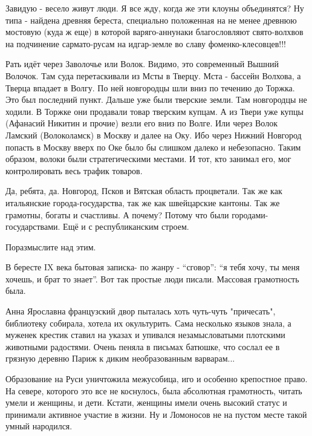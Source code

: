 \begin{itemize}
Завидую - весело живут люди. Я все жду, когда же эти клоуны объединятся? Ну
типа - найдена древняя береста, специально положенная на не менее древнюю
мостовую (куда ж еще) в которой варяго-аннунаки благословляют свято-волхвов на
подчинение сармато-русам на идгар-земле во славу фоменко-клесовцев!!!


Рать идёт через Заволочье или Волок. Видимо, это современный Вышний Волочок.
Там суда перетаскивали из Мсты в Тверцу. Мста - бассейн Волхова, а Тверца
впадает в Волгу. По ней новгородцы шли вниз по течению до Торжка. Это был
последний пункт. Дальше уже были тверские земли. Там новгородцы не ходили. В
Торжке они продавали товар тверским купцам. А из Твери уже купцы (Афанасий
Никитин и прочие) везли его вниз по Волге. Или через Волок Ламский
(Волоколамск) в Москву и далее на Оку. Ибо через Нижний Новгород попасть в
Москву вверх по Оке было бы слишком далеко и небезопасно. Таким образом, волоки
были стратегическими местами. И тот, кто занимал его, мог контролировать весь
трафик товаров.


Да, ребята, да. Новгород, Псков и Вятская область процветали. Так же как
итальянские города-государства, так же как швейцарские кантоны. Так же
грамотны, богаты и счастливы. А почему? Потому что были городами-государствами.
Ещё и с республиканским строем.

Поразмыслите над этим.


В бересте IX века бытовая записка- по жанру - \enquote{сговор}: \enquote{я тебя хочу, ты меня
хочешь, и брат то знает}. Вот так простые люди писали. Массовая грамотность
была.


Анна Ярославна французский двор пыталась хоть чуть-чуть "причесать", библиотеку
собирала, хотела их окультурить. Сама несколько языков знала, а муженек крестик
ставил на указах и упивался незамысловатыми плотскими животными радостями.
Очень пеняла в письмах батюшке, что сослал ее в грязную деревню Париж к диким
необразованным варварам...

Образование на Руси уничтожила межусобица, иго и особенно крепостное право. На
севере, которого это все не коснулось, была абсолютная грамотность, читать
умели и женщины, и дети. Кстати, женщины имели очень высокий статус и принимали
активное участие в жизни. Ну и Ломоносов не на пустом месте такой умный
народился.


\end{itemize}
